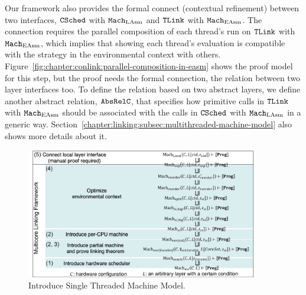Our framework also provides 
the formal connect (contextual refinement) between two interfaces, 
${{\mathrm{\texttt{CSched}}}}$ with ${\mathrm{\texttt{Mach}}}_{\mathrm{LAsm}}$ and ${{\mathrm{\texttt{TLink}}}}$ with ${\mathrm{\texttt{Mach}}}_{\mathrm{EAsm}}$.
The connection requires the parallel composition of each thread's run on ${{\mathrm{\texttt{TLink}}}}$ with ${\mathrm{\texttt{Mach}}}_{\mathrm{EAsm}}$,
which implies that showing each thread's evaluation is compatible with the strategy in the environmental context with others.
Figure~\ref{fig:chapter:conlink:parallel-composition-in-easm} shows the proof model for this step, 
but the proof needs the formal connection, the relation between two layer interfaces too. 
To define the relation based on two abstract layers, 
we define another abstract relation, ${\mathrm{\texttt{AbsRelC}}}$,
that specifies how primitive calls in ${{\mathrm{\texttt{TLink}}}}$ with ${\mathrm{\texttt{Mach}}}_{\mathrm{EAsm}}$ 
should be associated with the calls in ${{\mathrm{\texttt{CSched}}}}$ with ${\mathrm{\texttt{Mach}}}_{\mathrm{LAsm}}$ in a generic way. 
Section~\ref{chapter:linking:subsec:multithreaded-machine-model} also shows more details about it. 

\begin{figure}
\begin{center}
\includegraphics[width=0.9\textwidth, page=7]{figs/conlink/concurrent_linking}
\end{center}
\caption{Introduce Single Threaded Machine Model.}
\label{fig:chapter:conlink:introduce-single-threaded-machine-model-with-iiasm}
\end{figure}

